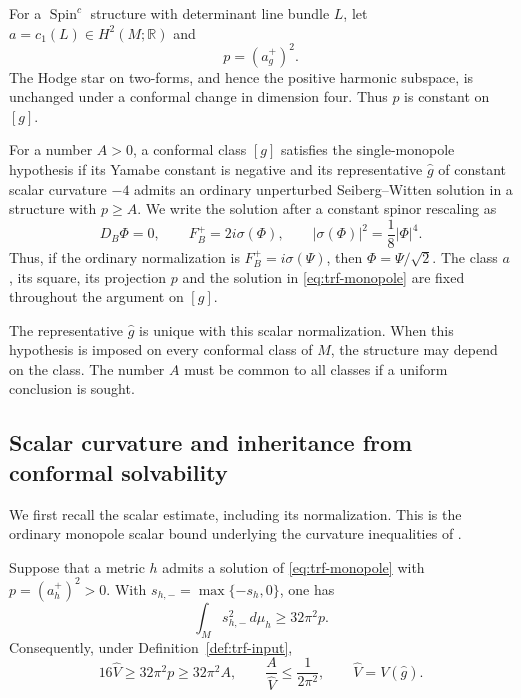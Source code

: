 For a $\operatorname{Spin}^c$ structure with determinant line bundle $L$,
let $a=c_1(L)\in H^2(M;\mathbb R)$ and
\[
 p=(a_g^+)^2.
\]
The Hodge star on two-forms, and hence the positive harmonic subspace,
is unchanged under a conformal change in dimension four.  Thus $p$ is
constant on $[g]$.

\begin{definition}
\label{def:trf-input}
For a number $A>0$, a conformal class $[g]$ satisfies the
single-monopole hypothesis if its Yamabe constant is negative and its
representative $\widehat g$ of constant scalar curvature $-4$ admits an
ordinary unperturbed Seiberg--Witten solution in a structure with
$p\ge A$.  We write the solution after a constant spinor rescaling as
\begin{equation}
 D_B\Phi=0,\qquad F_B^+=2i\sigma(\Phi),\qquad
 |\sigma(\Phi)|^2=\frac18|\Phi|^4.
 \label{eq:trf-monopole}
\end{equation}
Thus, if the ordinary normalization is $F_B^+=i\sigma(\Psi)$, then
$\Phi=\Psi/\sqrt2$.  The class $a$, its square, its projection $p$ and
the solution in \eqref{eq:trf-monopole} are fixed throughout the argument
on $[g]$.
\end{definition}

The representative $\widehat g$ is unique with this scalar normalization.
When this hypothesis is imposed on every conformal class of $M$, the
structure may depend on the class.  The number $A$ must be common to
all classes if a uniform conclusion is sought.

\subsection{Scalar curvature and inheritance from conformal solvability}

We first recall the scalar estimate, including its normalization.  This
is the ordinary monopole scalar bound underlying the curvature
inequalities of \cite{LeBrun2001}.

\begin{lemma}
\label{lem:trf-scalar}
Suppose that a metric $h$ admits a solution of
\eqref{eq:trf-monopole} with $p=(a_h^+)^2>0$.  With
$s_{h,-}=\max\{-s_h,0\}$, one has
\begin{equation}
 \int_M s_{h,-}^2\,d\mu_h\ge32\pi^2p.
 \label{eq:trf-signed-scalar}
\end{equation}
Consequently, under Definition~\ref{def:trf-input},
\begin{equation}
 16\widehat V\ge32\pi^2p\ge32\pi^2A,
 \qquad \frac{A}{\widehat V}\le\frac1{2\pi^2},
 \qquad \widehat V=V(\widehat g).
 \label{eq:trf-volume-budget}
\end{equation}
\end{lemma}

